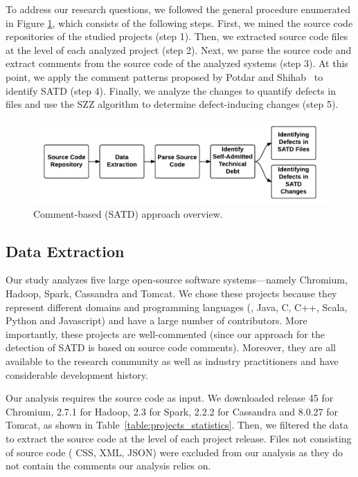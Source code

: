 To address our research questions, we followed the general procedure enumerated in Figure \ref{fig:Process_overview}, which consists of the following steps. First, we mined the source code repositories of the studied projects (step 1). Then, we extracted  source code files at the level of each analyzed project (step 2). Next, we parse the source code and extract comments from the source code of the analyzed systems (step 3). At this point, we apply the comment patterns proposed by Potdar and Shihab~\cite{ICSM_PotdarS14} to identify SATD (step 4). Finally, we analyze the changes to quantify defects in files and use the SZZ algorithm to determine defect-inducing changes (step 5).


\begin{figure}[t]
	\centering
	\includegraphics[width=150mm]{figures/chapter3/approach}
	\caption{Comment-based (SATD) approach overview.}
	\label{fig:Process_overview}
\end{figure}


\subsection{Data Extraction}
Our study analyzes five large open-source software systems---namely Chromium, Hadoop, Spark, Cassandra and Tomcat. We chose these projects because they represent different domains and programming languages (\ie{}, Java, C, C++,  Scala, Python and Javascript) and have a large number of contributors. More importantly, these projects are well-commented (since our approach for the detection of SATD is based on source code comments). Moreover, they are all available to the research community as well as industry practitioners and have considerable development history.

Our analysis requires the source code as input. We downloaded release 45 for Chromium, 2.7.1 for Hadoop, 2.3 for Spark, 2.2.2 for Cassandra and 8.0.27 for Tomcat, as shown in Table~\ref{table:projects_statistics}. Then, we filtered the data to extract the source code at the level of each project release. Files not consisting of source code (\eg{} CSS, XML, JSON) were excluded from our analysis as they do not contain the comments our analysis relies on.\\

